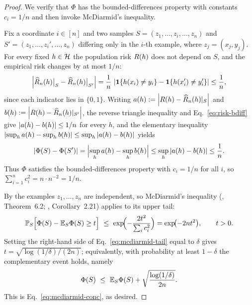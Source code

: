 \begin{proof}
We verify that $\Phi$ has the bounded-differences property with constants
$c_i=1/n$ and then invoke McDiarmid's inequality.

Fix a coordinate $i\in[n]$ and two samples $S=(z_1,\dots,z_i,\dots,z_n)$ and
$S'=(z_1,\dots,z_i',\dots,z_n)$ differing only in the $i$-th example, where
$z_j=(x_j,y_j)$. For every fixed $h\in\mathcal{H}$ the population risk $R(h)$ does
not depend on $S$, and the empirical risk changes by at most $1/n$:
\begin{align}\label{eq:risk-bdiff}
\left| \widehat{R}_n(h)\big|_{S}-\widehat{R}_n(h)\big|_{S'} \right|
=\frac1n\,\left| \mathbf{1}\{h(x_i)\neq y_i\}-\mathbf{1}\{h(x_i')\neq y_i'\} \right|
\le\frac1n,
\end{align}
since each indicator lies in $\{0,1\}$. Writing $a(h):=\left| R(h)
-\widehat{R}_n(h)|_{S} \right|$ and $b(h):=\left| R(h)-\widehat{R}_n(h)|_{S'} \right|$, the
reverse triangle inequality and Eq.~\eqref{eq:risk-bdiff} give
$\left| a(h)-b(h) \right|\le 1/n$ for every $h$, and the elementary inequality
$\left| \sup_h a(h)-\sup_h b(h) \right|\le\sup_h\left| a(h)-b(h) \right|$ yields
\begin{align}\label{eq:phi-bdiff}
\left| \Phi(S)-\Phi(S') \right|
=\Bigl|\sup_{h}a(h)-\sup_{h}b(h)\Bigr|
\le\sup_{h}\left| a(h)-b(h) \right|
\le\frac1n.
\end{align}
Thus $\Phi$ satisfies the bounded-differences property with $c_i=1/n$ for all
$i$, so $\sum_{i=1}^{n}c_i^{2}=n\cdot n^{-2}=1/n$.

By  the examples $z_1,\dots,z_n$ are independent, so McDiarmid's
inequality (\cite{boucheron2013concentration}, Theorem~6.2;
\cite{wainwright2019high}, Corollary~2.21) applies to its upper tail:
\begin{align}\label{eq:mcdiarmid-tail}
\mathbb{P}_{S}\Bigl[\Phi(S)-\mathbb{E}_S\Phi(S)\ge t\Bigr]
\ \le\ \exp\!\Bigl(-\frac{2t^{2}}{\sum_{i}c_i^{2}}\Bigr)
=\exp\!\bigl(-2nt^{2}\bigr),
\qquad t>0.
\end{align}
Setting the right-hand side of Eq.~\eqref{eq:mcdiarmid-tail} equal to $\delta$ gives
$t=\sqrt{\log(1/\delta)/(2n)}$; equivalently, with probability at least
$1-\delta$ the complementary event holds, namely
\begin{align*}
\Phi(S)\ \le\ \mathbb{E}_S\Phi(S)+\sqrt{\frac{\log(1/\delta)}{2n}}.
\end{align*}
This is Eq.~\eqref{eq:mcdiarmid-conc}, as desired.
\end{proof}
